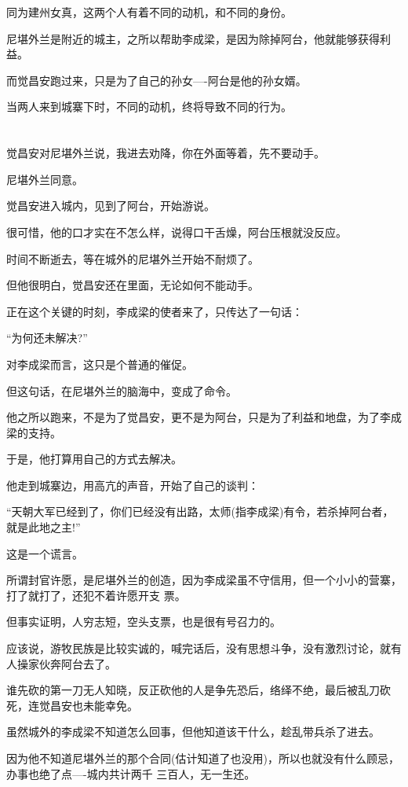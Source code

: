 \documentclass[11pt,a4paper,onecolumn]{article}
\begin{document}
同为建州女真，这两个人有着不同的动机，和不同的身份。

尼堪外兰是附近的城主，之所以帮助李成梁，是因为除掉阿台，他就能够获得利益。

而觉昌安跑过来，只是为了自己的孙女----阿台是他的孙女婿。

当两人来到城寨下时，不同的动机，终将导致不同的行为。

\section[\thesection]{}

觉昌安对尼堪外兰说，我进去劝降，你在外面等着，先不要动手。

尼堪外兰同意。

觉昌安进入城内，见到了阿台，开始游说。

很可惜，他的口才实在不怎么样，说得口干舌燥，阿台压根就没反应。

时间不断逝去，等在城外的尼堪外兰开始不耐烦了。

但他很明白，觉昌安还在里面，无论如何不能动手。

正在这个关键的时刻，李成梁的使者来了，只传达了一句话：

``为何还未解决?''

对李成梁而言，这只是个普通的催促。

但这句话，在尼堪外兰的脑海中，变成了命令。

他之所以跑来，不是为了觉昌安，更不是为阿台，只是为了利益和地盘，为了李成梁的支持。

于是，他打算用自己的方式去解决。

他走到城寨边，用高亢的声音，开始了自己的谈判：

``天朝大军已经到了，你们已经没有出路，太师(指李成梁)有令，若杀掉阿台者，就是此地之主!''

这是一个谎言。

所谓封官许愿，是尼堪外兰的创造，因为李成梁虽不守信用，但一个小小的营寨，打了就打了，还犯不着许愿开支
票。

但事实证明，人穷志短，空头支票，也是很有号召力的。

应该说，游牧民族是比较实诚的，喊完话后，没有思想斗争，没有激烈讨论，就有人操家伙奔阿台去了。

谁先砍的第一刀无人知晓，反正砍他的人是争先恐后，络绎不绝，最后被乱刀砍死，连觉昌安也未能幸免。

虽然城外的李成梁不知道怎么回事，但他知道该干什么，趁乱带兵杀了进去。

因为他不知道尼堪外兰的那个合同(估计知道了也没用)，所以也就没有什么顾忌，办事也绝了点----城内共计两千
三百人，无一生还。
\end{document}
